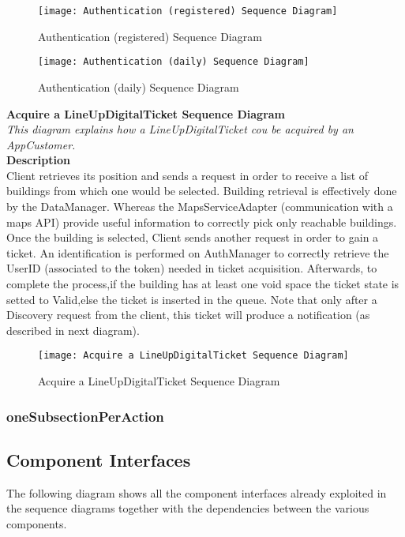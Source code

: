 \begin{figure}[H]
 \centering
 \texttt{[image: Authentication (registered) Sequence Diagram]}
 \caption{ Authentication (registered) Sequence Diagram}
 \end{figure}

\begin{figure}[H]
 \centering
 \texttt{[image: Authentication (daily) Sequence Diagram]}
 \caption{Authentication (daily) Sequence Diagram}
 \end{figure}

\newpage
\textbf{ Acquire a LineUpDigitalTicket Sequence Diagram\\}
\textit{This diagram explains how a LineUpDigitalTicket cou be acquired by an AppCustomer.\\}
\textbf{Description\\}
Client retrieves its position and sends a request in order to receive a list of buildings from which one would be selected. Building retrieval is effectively done by the DataManager. Whereas the MapsServiceAdapter (communication with a maps API) provide useful information to correctly pick only reachable buildings.
Once the building is selected, Client sends another request in order to gain a ticket. An identification is performed on AuthManager to correctly retrieve the UserID (associated to the token) needed in ticket acquisition. Afterwards, to complete the process,if the building has at least one void space the ticket state is setted to Valid,else the ticket is inserted in the queue.
Note that only after a Discovery request from the client, this ticket will produce a notification (as described in next diagram).\\

\begin{figure}[H]
 \centering
 \texttt{[image: Acquire a LineUpDigitalTicket Sequence Diagram]}
 \caption{ Acquire a LineUpDigitalTicket Sequence Diagram}
 \end{figure}



\subsubsection{oneSubsectionPerAction}

\subsection{Component Interfaces}
The following diagram shows all the component interfaces already exploited in the sequence diagrams together with the dependencies between the various components. 

